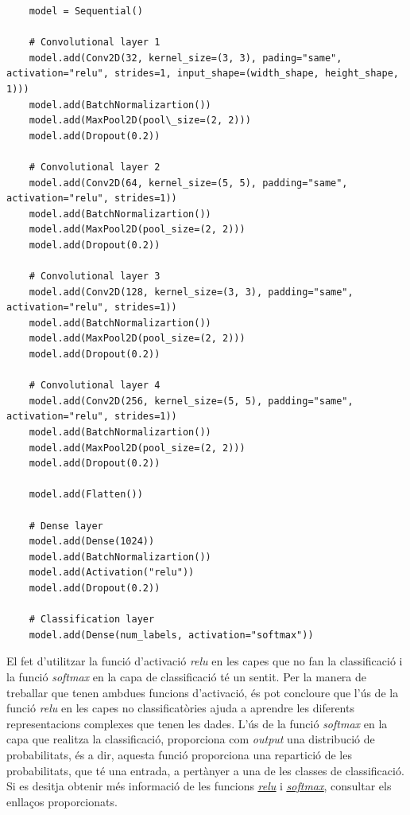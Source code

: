 \documentclass[a4paper,12pt]{report}
\begin{document}
\begin{lstlisting}
    model = Sequential()

    # Convolutional layer 1
    model.add(Conv2D(32, kernel_size=(3, 3), pading="same", activation="relu", strides=1, input_shape=(width_shape, height_shape, 1)))
    model.add(BatchNormalizartion())
    model.add(MaxPool2D(pool\_size=(2, 2)))
    model.add(Dropout(0.2))

    # Convolutional layer 2
    model.add(Conv2D(64, kernel_size=(5, 5), padding="same", activation="relu", strides=1))
    model.add(BatchNormalizartion())
    model.add(MaxPool2D(pool_size=(2, 2)))
    model.add(Dropout(0.2))

    # Convolutional layer 3
    model.add(Conv2D(128, kernel_size=(3, 3), padding="same", activation="relu", strides=1))
    model.add(BatchNormalizartion())
    model.add(MaxPool2D(pool_size=(2, 2)))
    model.add(Dropout(0.2))

    # Convolutional layer 4
    model.add(Conv2D(256, kernel_size=(5, 5), padding="same", activation="relu", strides=1))
    model.add(BatchNormalizartion())
    model.add(MaxPool2D(pool_size=(2, 2)))
    model.add(Dropout(0.2))

    model.add(Flatten())

    # Dense layer
    model.add(Dense(1024))
    model.add(BatchNormalizartion())
    model.add(Activation("relu"))
    model.add(Dropout(0.2))

    # Classification layer
    model.add(Dense(num_labels, activation="softmax"))
\end{lstlisting}
El fet d'utilitzar la funció d'activació \textit{relu} en les capes que no fan la classificació i la funció \textit{softmax} en la capa de classificació té un sentit. Per la manera de treballar que tenen ambdues funcions d'activació, és pot concloure que l'ús de la funció \textit{relu} en les capes no classificatòries ajuda a aprendre les diferents representacions complexes que tenen les dades. L'ús de la funció \textit{softmax} en la capa que realitza la classificació, proporciona com \textit{output} una distribució de probabilitats, és a dir, aquesta funció proporciona una repartició de les probabilitats, que té una entrada, a pertànyer a una de les classes de classificació.\\
Si es desitja obtenir més informació de les funcions \href{https://machinelearningmastery.com/rectified-linear-activation-function-for-deep-learning-neural-networks/}{\underline{\textit{relu}}} i \href{https://interactivechaos.com/es/manual/tutorial-de-machine-learning/regresion-softmax}{\underline{\textit{softmax}}}, consultar els enllaços proporcionats.
\end{document}
